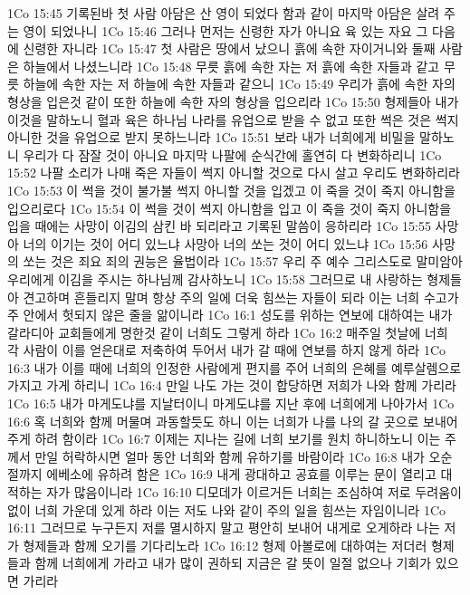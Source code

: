 1Co 15:45  기록된바 첫 사람 아담은 산 영이 되었다 함과 같이 마지막 아담은 살려 주는 영이 되었나니
1Co 15:46  그러나 먼저는 신령한 자가 아니요 육 있는 자요 그 다음에 신령한 자니라
1Co 15:47  첫 사람은 땅에서 났으니 흙에 속한 자이거니와 둘째 사람은 하늘에서 나셨느니라
1Co 15:48  무릇 흙에 속한 자는 저 흙에 속한 자들과 같고 무릇 하늘에 속한 자는 저 하늘에 속한 자들과 같으니
1Co 15:49  우리가 흙에 속한 자의 형상을 입은것 같이 또한 하늘에 속한 자의 형상을 입으리라
1Co 15:50  형제들아 내가 이것을 말하노니 혈과 육은 하나님 나라를 유업으로 받을 수 없고 또한 썩은 것은 썩지 아니한 것을 유업으로 받지 못하느니라
1Co 15:51  보라 내가 너희에게 비밀을 말하노니 우리가 다 잠잘 것이 아니요 마지막 나팔에 순식간에 홀연히 다 변화하리니
1Co 15:52  나팔 소리가 나매 죽은 자들이 썩지 아니할 것으로 다시 살고 우리도 변화하리라
1Co 15:53  이 썩을 것이 불가불 썩지 아니할 것을 입겠고 이 죽을 것이 죽지 아니함을 입으리로다
1Co 15:54  이 썩을 것이 썩지 아니함을 입고 이 죽을 것이 죽지 아니함을 입을 때에는 사망이 이김의 삼킨 바 되리라고 기록된 말씀이 응하리라
1Co 15:55  사망아 너의 이기는 것이 어디 있느냐 사망아 너의 쏘는 것이 어디 있느냐
1Co 15:56  사망의 쏘는 것은 죄요 죄의 권능은 율법이라
1Co 15:57  우리 주 예수 그리스도로 말미암아 우리에게 이김을 주시는 하나님께 감사하노니
1Co 15:58  그러므로 내 사랑하는 형제들아 견고하며 흔들리지 말며 항상 주의 일에 더욱 힘쓰는 자들이 되라 이는 너희 수고가 주 안에서 헛되지 않은 줄을 앎이니라
1Co 16:1  성도를 위하는 연보에 대하여는 내가 갈라디아 교회들에게 명한것 같이 너희도 그렇게 하라
1Co 16:2  매주일 첫날에 너희 각 사람이 이를 얻은대로 저축하여 두어서 내가 갈 때에 연보를 하지 않게 하라
1Co 16:3  내가 이를 때에 너희의 인정한 사람에게 편지를 주어 너희의 은혜를 예루살렘으로 가지고 가게 하리니
1Co 16:4  만일 나도 가는 것이 합당하면 저희가 나와 함께 가리라
1Co 16:5  내가 마게도냐를 지날터이니 마게도냐를 지난 후에 너희에게 나아가서
1Co 16:6  혹 너희와 함께 머물며 과동할듯도 하니 이는 너희가 나를 나의 갈 곳으로 보내어 주게 하려 함이라
1Co 16:7  이제는 지나는 길에 너희 보기를 원치 하니하노니 이는 주께서 만일 허락하시면 얼마 동안 너희와 함께 유하기를 바람이라
1Co 16:8  내가 오순절까지 에베소에 유하려 함은
1Co 16:9  내게 광대하고 공효를 이루는 문이 열리고 대적하는 자가 많음이니라
1Co 16:10  디모데가 이르거든 너희는 조심하여 저로 두려움이 없이 너희 가운데 있게 하라 이는 저도 나와 같이 주의 일을 힘쓰는 자임이니라
1Co 16:11  그러므로 누구든지 저를 멸시하지 말고 평안히 보내어 내게로 오게하라 나는 저가 형제들과 함께 오기를 기다리노라
1Co 16:12  형제 아볼로에 대하여는 저더러 형제들과 함께 너희에게 가라고 내가 많이 권하되 지금은 갈 뜻이 일절 없으나 기회가 있으면 가리라
